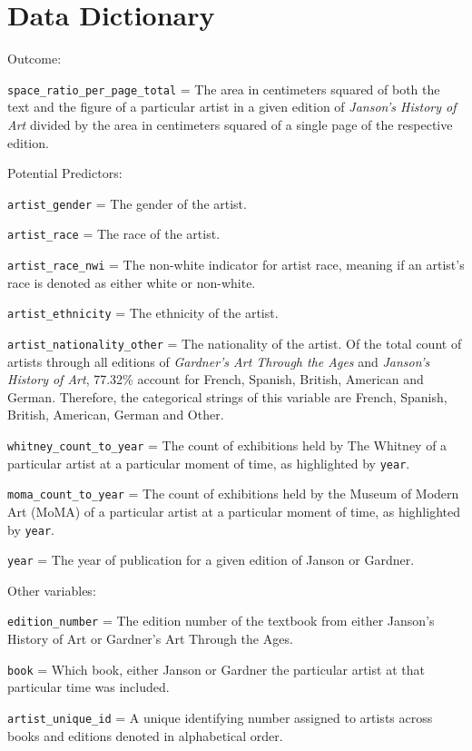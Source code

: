 \documentclass[
  letterpaper,
  DIV=11,
  numbers=noendperiod]{scrreprt}
\begin{document}
\hypertarget{data-dictionary}{%
\section{Data Dictionary}\label{data-dictionary}}

Outcome:

\texttt{space\_ratio\_per\_page\_total} = The area in centimeters
squared of both the text and the figure of a particular artist in a
given edition of \emph{Janson's History of Art} divided by the area in
centimeters squared of a single page of the respective edition.

Potential Predictors:

\texttt{artist\_gender} = The gender of the artist.

\texttt{artist\_race} = The race of the artist.

\texttt{artist\_race\_nwi} = The non-white indicator for artist race,
meaning if an artist's race is denoted as either white or non-white.

\texttt{artist\_ethnicity} = The ethnicity of the artist.

\texttt{artist\_nationality\_other} = The nationality of the artist. Of
the total count of artists through all editions of \emph{Gardner's Art
Through the Ages} and \emph{Janson's History of Art}, 77.32\% account
for French, Spanish, British, American and German. Therefore, the
categorical strings of this variable are French, Spanish, British,
American, German and Other.

\texttt{whitney\_count\_to\_year} = The count of exhibitions held by The
Whitney of a particular artist at a particular moment of time, as
highlighted by \texttt{year}.

\texttt{moma\_count\_to\_year} = The count of exhibitions held by the
Museum of Modern Art (MoMA) of a particular artist at a particular
moment of time, as highlighted by \texttt{year}.

\texttt{year} = The year of publication for a given edition of Janson or
Gardner.

Other variables:

\texttt{edition\_number} = The edition number of the textbook from
either Janson's History of Art or Gardner's Art Through the Ages.

\texttt{book} = Which book, either Janson or Gardner the particular
artist at that particular time was included.

\texttt{artist\_unique\_id} = A unique identifying number assigned to
artists across books and editions denoted in alphabetical order.
\end{document}
